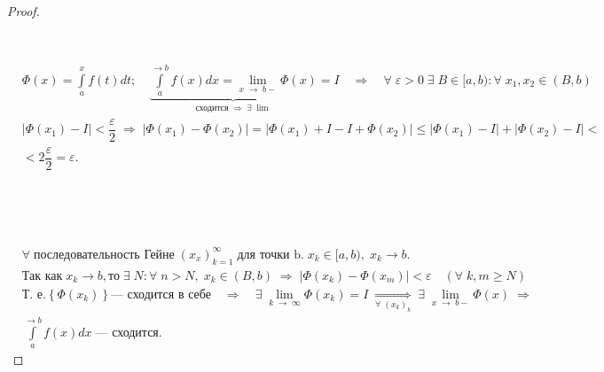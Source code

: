 \documentclass[../main.tex]{subfiles}
\begin{document}
\begin{proof}

    ~

    \boxed{\Rightarrow} 

    ~
    
    \(
    \begin{aligned}
        &\Phi(x) = \displaystyle\int\limits_{ a}^{ x} f(t)dt;\quad \underbrace{\displaystyle\int\limits_{ a}^{ \rightarrow b} f(x)dx = \lim\limits_{ x \; \rightarrow \; b-} \Phi(x)}_{\text{сходится} \; \Rightarrow \; \exists \; \lim } = I \quad\Rightarrow\quad \forall \; \varepsilon> 0 \; \exists \; B \in [a, b): \forall \; x_1, x_2 \in (B, b) \\[5pt] 
        &\left| \Phi(x_1) - I\right| < \dfrac{ \varepsilon}{ 2} \;\Rightarrow\; \left| \Phi(x_1) - \Phi(x_2)\right| = \left| \Phi(x_1) + I - I + \Phi(x_2)\right| \leq \left| \Phi(x_1) - I\right| + \left| \Phi(x_2) - I\right| < \\[5pt] 
        &< 2 \dfrac{ \varepsilon}{ 2} = \varepsilon.
    \end{aligned}
    \)

    ~

    \boxed{\Leftarrow}

    ~

    \( 
    \begin{aligned}
        &\forall \; \text{последовательность Гейне}\; (x_x)_{k = 1}^\infty \; \text{для точки b.}\; x_k \in [a, b), \; x_k \rightarrow  b. \\[5pt]
        &\text{Так как} \; x_k \rightarrow b, \text{то} \; \exists \; N: \forall \; n > N, \; x_k \in (B, b) \; \Rightarrow \; \left| \Phi(x_k) - \Phi(x_m)\right| < \varepsilon \quad ( \forall \; k, m \geq N ) \\[5pt]
        &\text{Т. е.} \left\{ \Phi(x_k)\right\}  \text{--- сходится в себе}\quad \Rightarrow\quad \exists \; \lim\limits_{ k \; \rightarrow \; \infty} \Phi(x_k) = I\;  \underset{ \forall \; (x_k)_k}{\Longrightarrow}\; \exists \; \lim\limits_{ x \; \rightarrow \; b-} \Phi(x) \; \Rightarrow \\
        &\displaystyle\int\limits_{ a}^{ \rightarrow b} f(x)dx \; \text{--- сходится}. 
     \end{aligned}
    \)
\end{proof}
\end{document}
